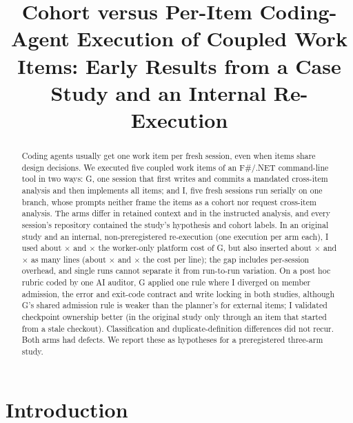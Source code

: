 \documentclass[10pt,conference]{IEEEtran}
\newcommand{\G}{G}
\newcommand{\I}{I}
\begin{document}
\title{Cohort versus Per-Item Coding-Agent Execution of Coupled Work Items: Early Results from a Case Study and an Internal Re-Execution}

\author{}

\maketitle

\begin{abstract}
Coding agents usually get one work item per fresh session, even when items share design decisions. We executed five coupled work items of an F\#/.NET command-line tool in two ways: \G, one session that first writes and commits a mandated cross-item analysis and then implements all items; and \I, five fresh sessions run serially on one branch, whose prompts neither frame the items as a cohort nor request cross-item analysis. %
The arms differ in retained context and in the instructed analysis, and every session's repository contained the study's hypothesis and cohort labels. %
In an original study and an internal, non-preregistered re-execution (one execution per arm each), \I{} used about \AcostRatio$\times$ and \RtwoCostRatio$\times$ the worker-only platform cost of \G, but also inserted about \AinsLinesRatio$\times$ and \RtwoInsLinesRatio$\times$ as many lines (about \AcostPerLineRatio$\times$ and \RtwoCostPerLineRatio$\times$ the cost per line); the gap includes per-session overhead, and single runs cannot separate it from run-to-run variation. %
On a post hoc rubric coded by one AI auditor, \G{} applied one rule where \I{} diverged on member admission, the error and exit-code contract and write locking in both studies, although \G's shared admission rule is weaker than the planner's for external items; \I{} validated checkpoint ownership better (in the original study only through an item that started from a stale checkout). Classification and duplicate-definition differences did not recur. Both arms had defects. We report these as hypotheses for a preregistered three-arm study. %
\end{abstract}

\section{Introduction}
\end{document}

